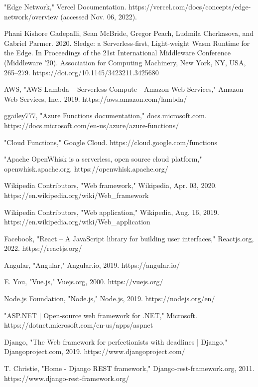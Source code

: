 \begin{thebibliography}{9}
"Edge Network," Vercel Documentation. https://vercel.com/docs/concepts/edge-network/overview (accessed Nov. 06, 2022).

Phani Kishore Gadepalli, Sean McBride, Gregor Peach, Ludmila Cherkasova, and Gabriel Parmer. 2020. Sledge: a Serverless-first, Light-weight Wasm Runtime for the Edge. In Proceedings of the 21st International Middleware Conference (Middleware '20). Association for Computing Machinery, New York, NY, USA, 265–279. https://doi.org/10.1145/3423211.3425680

AWS, "AWS Lambda – Serverless Compute - Amazon Web Services," Amazon Web Services, Inc., 2019. https://aws.amazon.com/lambda/

ggailey777, "Azure Functions documentation," docs.microsoft.com. https://docs.microsoft.com/en-us/azure/azure-functions/

"Cloud Functions," Google Cloud. https://cloud.google.com/functions

"Apache OpenWhisk is a serverless, open source cloud platform," openwhisk.apache.org. https://openwhisk.apache.org/

Wikipedia Contributors, "Web framework," Wikipedia, Apr. 03, 2020. https://en.wikipedia.org/wiki/Web\_framework

Wikipedia Contributors, "Web application," Wikipedia, Aug. 16, 2019. https://en.wikipedia.org/wiki/Web\_application

Facebook, "React – A JavaScript library for building user interfaces," Reactjs.org, 2022. https://reactjs.org/

Angular, "Angular," Angular.io, 2019. https://angular.io/

E. You, "Vue.js," Vuejs.org, 2000. https://vuejs.org/

Node.js Foundation, "Node.js," Node.js, 2019. https://nodejs.org/en/

"ASP.NET | Open-source web framework for .NET," Microsoft. https://dotnet.microsoft.com/en-us/apps/aspnet

Django, "The Web framework for perfectionists with deadlines | Django," Djangoproject.com, 2019. https://www.djangoproject.com/

T. Christie, "Home - Django REST framework," Django-rest-framework.org, 2011. https://www.django-rest-framework.org/


\end{thebibliography}
